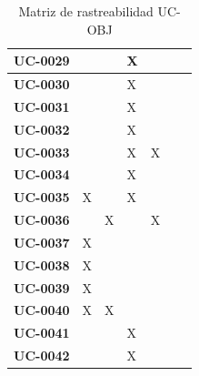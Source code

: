 \begin{table}[H]
\begin{tabular}{|p{2.2cm}|p{2.0cm}|p{2.0cm}|p{2.0cm}|p{2.0cm}|p{2.0cm}|p{2.0cm}|}
\hline
\textbf{UC-0029} & & & X & & & \\
\hline
\textbf{UC-0030} & & & X & & & \\
\hline
\textbf{UC-0031} & & & X & & & \\
\hline
\textbf{UC-0032} & & & X & & & \\
\hline
\textbf{UC-0033} & & & X & X & & \\
\hline
\textbf{UC-0034} & & & X & & & \\
\hline
\textbf{UC-0035} & X & & X & & & \\
\hline
\textbf{UC-0036} & & X & & X & & \\
\hline
\textbf{UC-0037} & X & & & & & \\
\hline
\textbf{UC-0038} & X & & & & & \\
\hline
\textbf{UC-0039} & X & & & & & \\
\hline
\textbf{UC-0040} & X & X & & & & \\
\hline
\textbf{UC-0041} & & & X & & & \\
\hline
\textbf{UC-0042} & & & X & & & \\
\hline
\end{tabular}
\caption{Matriz de rastreabilidad UC-OBJ}
\label{tab:matriz-uc-obj}
\end{table}